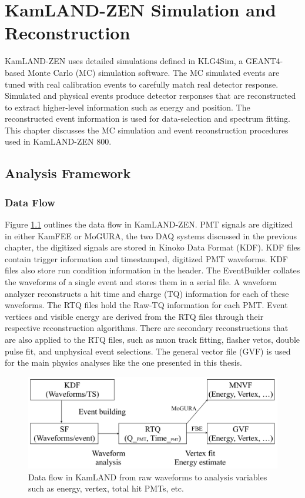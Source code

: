 \chapter{KamLAND-ZEN Simulation and Reconstruction}
\label{chapter:details}
\thispagestyle{myheadings}

\graphicspath{{3_Chapter_KLZ_Simulation_and_Reconstruction/Figures/}}

KamLAND-ZEN uses detailed simulations defined in KLG4Sim, a GEANT4-based Monte Carlo (MC) simulation software. The MC simulated events are tuned with real calibration events to carefully match real detector response. Simulated and physical events produce detector responses that are reconstructed to extract higher-level information such as energy and position. The reconstructed event information is used for data-selection and spectrum fitting. This chapter discusses the MC simulation and event reconstruction procedures used in KamLAND-ZEN 800.

\section{Analysis Framework}
\subsection{Data Flow}
Figure \ref{fig:dataflow} outlines the data flow in KamLAND-ZEN. PMT signals are digitized in either KamFEE or MoGURA, the two DAQ systems discussed in the previous chapter, the digitized signals are stored in Kinoko Data Format (KDF). KDF files contain trigger information and timestamped, digitized PMT waveforms. KDF files also store run condition information in the header. The EventBuilder collates the waveforms of a single event and stores them in a serial file. A waveform analyzer reconstructs a hit time and charge (TQ) information for each of these waveforms. The RTQ files hold the Raw-TQ information for each PMT. Event vertices and visible energy are derived from the RTQ files through their respective reconstruction algorithms. There are secondary reconstructions that are also applied to the RTQ files, such as muon track fitting, flasher vetos, double pulse fit, and unphysical event selections. The general vector file (GVF) is used for the main physics analyses like the one presented in this thesis.

\begin{figure}[htb]
	\centering
	\includegraphics[scale=0.3]{dataflow.png}
	\caption{Data flow in KamLAND from raw waveforms to analysis variables such as energy, vertex, total hit PMTs, etc. \cite{ozaki_phd}}
	\label{fig:dataflow}
\end{figure}

